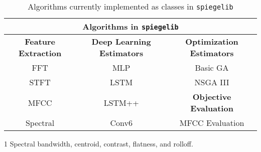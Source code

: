 \begin{table*}[t]
\centering\small
\begin{threeparttable}
	\caption{Algorithms currently implemented as classes in \texttt{spiegelib}}
	\label{table:spiegel_algorithms}
	\begin{tabular}{|c|c|c|}
	\hline
	\multicolumn{3}{|c|}{\textbf{Algorithms in \texttt{spiegelib}}} \\
	\hline
	\hline
	\textbf{Feature Extraction} & \textbf{Deep Learning Estimators} & \textbf{Optimization Estimators} \\
	\hline
	FFT 		& MLP \cite{yee2018automatic} 		& Basic GA   			\\
	STFT 		& LSTM \cite{yee2018automatic} 		& NSGA III \cite{tatar2016automatic}				\\\cline{3-3}
	MFCC		& LSTM++ \cite{yee2018automatic} 	& \textbf{Objective Evaluation} 	\\\cline{3-3}
	Spectral\tnote{1}	& Conv6 \cite{barkan2019inversynth} 	& MFCC Evaluation 		\\
	\hline
	\end{tabular}
	\begin{tablenotes}
			\footnotesize
			\item[1] Spectral bandwidth, centroid, contrast, flatness, and rolloff.
	\end{tablenotes}
\end{threeparttable}
\end{table*}